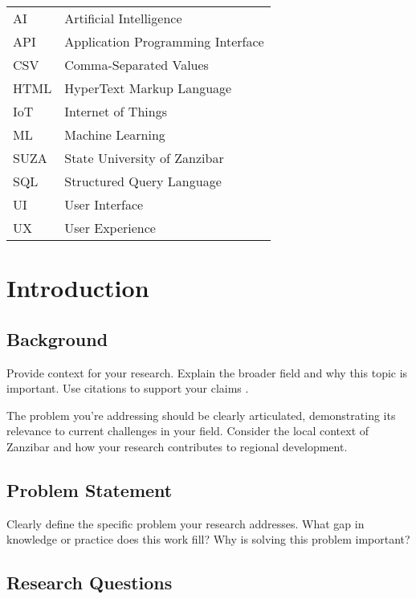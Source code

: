 \documentclass[12pt, a4paper]{report}
\begin{document}
	\begin{tabular}{ll}
		AI & Artificial Intelligence \\
		API & Application Programming Interface \\
		CSV & Comma-Separated Values \\
		HTML & HyperText Markup Language \\
		IoT & Internet of Things \\
		ML & Machine Learning \\
		SUZA & State University of Zanzibar \\
		SQL & Structured Query Language \\
		UI & User Interface \\
		UX & User Experience \\
	\end{tabular}
	
	
	\chapter{Introduction}
	\label{chap:introduction}
	
	\section{Background}
	\label{sec:background}
	
	Provide context for your research. Explain the broader field and why this topic is important. Use citations to support your claims \citep{smith2023, jones2022}.
	
	The problem you're addressing should be clearly articulated, demonstrating its relevance to current challenges in your field. Consider the local context of Zanzibar and how your research contributes to regional development.
	
	\section{Problem Statement}
	\label{sec:problem}
	
	Clearly define the specific problem your research addresses. What gap in knowledge or practice does this work fill? Why is solving this problem important?
	
	\section{Research Questions}
	\label{sec:questions}
	
\end{document}
